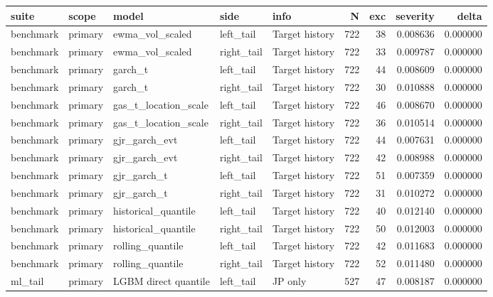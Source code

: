 \begin{tabular}{lllllrrrr}
\toprule
suite & scope & model & side & info & N & exc & severity & delta \\
\midrule
benchmark & primary & ewma\_vol\_scaled & left\_tail & Target history & 722 & 38 & 0.008636 & 0.000000 \\
benchmark & primary & ewma\_vol\_scaled & right\_tail & Target history & 722 & 33 & 0.009787 & 0.000000 \\
benchmark & primary & garch\_t & left\_tail & Target history & 722 & 44 & 0.008609 & 0.000000 \\
benchmark & primary & garch\_t & right\_tail & Target history & 722 & 30 & 0.010888 & 0.000000 \\
benchmark & primary & gas\_t\_location\_scale & left\_tail & Target history & 722 & 46 & 0.008670 & 0.000000 \\
benchmark & primary & gas\_t\_location\_scale & right\_tail & Target history & 722 & 36 & 0.010514 & 0.000000 \\
benchmark & primary & gjr\_garch\_evt & left\_tail & Target history & 722 & 44 & 0.007631 & 0.000000 \\
benchmark & primary & gjr\_garch\_evt & right\_tail & Target history & 722 & 42 & 0.008988 & 0.000000 \\
benchmark & primary & gjr\_garch\_t & left\_tail & Target history & 722 & 51 & 0.007359 & 0.000000 \\
benchmark & primary & gjr\_garch\_t & right\_tail & Target history & 722 & 31 & 0.010272 & 0.000000 \\
benchmark & primary & historical\_quantile & left\_tail & Target history & 722 & 40 & 0.012140 & 0.000000 \\
benchmark & primary & historical\_quantile & right\_tail & Target history & 722 & 50 & 0.012003 & 0.000000 \\
benchmark & primary & rolling\_quantile & left\_tail & Target history & 722 & 42 & 0.011683 & 0.000000 \\
benchmark & primary & rolling\_quantile & right\_tail & Target history & 722 & 52 & 0.011480 & 0.000000 \\
ml\_tail & primary & LGBM direct quantile & left\_tail & JP only & 527 & 47 & 0.008187 & 0.000000 \\

\end{tabular}
